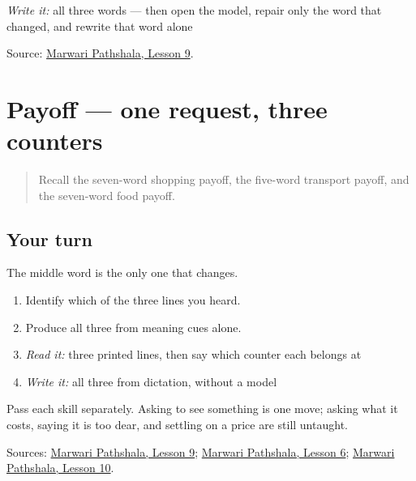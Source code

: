 \emph{Write it:} all three words — then open the model, repair only the word that changed, and rewrite that word alone

\begin{tcolorbox}[breakable,colback=teal!4,colframe=teal!35!black,title={Before you move on}]
Source: \href{https://www.marwaripathshala.com/marwari-lesson-9-english}{Marwari Pathshala, Lesson 9}.
\end{tcolorbox}
\section[Practice]{Payoff — one request, three counters}

\label{lesson:MW-C21-show-three}



\begin{quote}
Recall the seven-word shopping payoff, the five-word transport payoff, and the seven-word food payoff.
\end{quote}

\subsection*{Your turn}
The middle word is the only one that changes.

\begin{enumerate}
\raggedright
  \item Identify which of the three lines you heard.
  \item Produce all three from meaning cues alone.
  \item \emph{Read it:} three printed lines, then say which counter each belongs at
  \item \emph{Write it:} all three from dictation, without a model
\end{enumerate}

Pass each skill separately. Asking to see something is one move; asking what it costs, saying it is too dear, and settling on a price are still untaught.

\begin{tcolorbox}[breakable,colback=teal!4,colframe=teal!35!black,title={Before you move on}]
Sources: \href{https://www.marwaripathshala.com/marwari-lesson-9-english}{Marwari Pathshala, Lesson 9}; \href{https://www.marwaripathshala.com/marwari-lesson-6-english}{Marwari Pathshala, Lesson 6}; \href{https://www.marwaripathshala.com/marwari-lesson-10-english}{Marwari Pathshala, Lesson 10}.
\end{tcolorbox}

